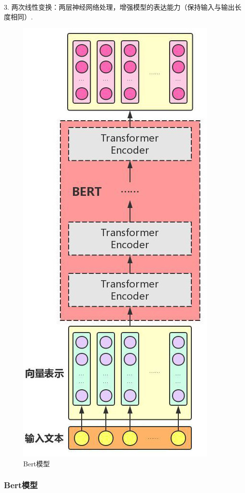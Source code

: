 \documentclass[12pt, a4paper, oneside]{ctexart}
\numberwithin{equation}{section}  %
\begin{document}
3. 两次线性变换：两层神经网络处理，增强模型的表达能力（保持输入与输出长度相同）.
\clearpage
{
\begin{figure}
\centering
\includegraphics[scale=0.4]{../NLP大作业note.figure/Bert.jpg}
\caption{Bert模型}
\label{fig-bert}
\end{figure}
\subsubsection{Bert模型}

}
\end{document}
